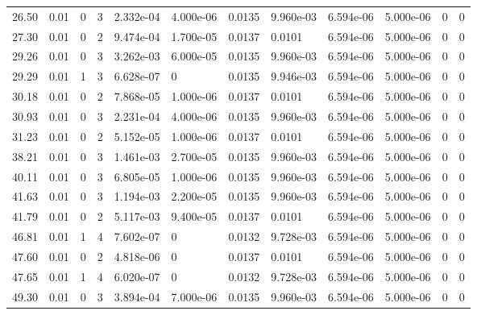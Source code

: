 \documentclass[preview]{standalone}
\begin{document}
{{\begin{tabular}{L{1.2cm}C{1.2cm} C{0.3cm}C{0.5cm} C{1.4cm}C{1.4cm} C{1.4cm}C{1.4cm} C{1.6cm}C{1.6cm} C{1.6cm}C{1.6cm}}
  26.50  &  0.01  & 0     &  3 &  2.332e-04  & 4.000e-06  &  0.0135&   9.960e-03& 6.594e-06 & 5.000e-06   &  0 & 0  \\ 
  27.30  &  0.01  & 0     &  2 &  9.474e-04  & 1.700e-05  &  0.0137&   0.0101& 6.594e-06 & 5.000e-06   &  0 & 0  \\ 
  29.26  &  0.01  & 0     &  3 &  3.262e-03  & 6.000e-05  &  0.0135&   9.960e-03& 6.594e-06 & 5.000e-06   &  0 & 0  \\ 
  29.29  &  0.01  & 1     &  3 &  6.628e-07  & 0  &  0.0135&   9.946e-03& 6.594e-06 & 5.000e-06   &  0 & 0  \\ 
  30.18  &  0.01  & 0     &  2 &  7.868e-05  & 1.000e-06  &  0.0137&   0.0101& 6.594e-06 & 5.000e-06   &  0 & 0  \\ 
  30.93  &  0.01  & 0     &  3 &  2.231e-04  & 4.000e-06  &  0.0135&   9.960e-03& 6.594e-06 & 5.000e-06   &  0 & 0  \\ 
  31.23  &  0.01  & 0     &  2 &  5.152e-05  & 1.000e-06  &  0.0137&   0.0101& 6.594e-06 & 5.000e-06   &  0 & 0  \\ 
  38.21  &  0.01  & 0     &  3 &  1.461e-03  & 2.700e-05  &  0.0135&   9.960e-03& 6.594e-06 & 5.000e-06   &  0 & 0  \\ 
  40.11  &  0.01  & 0     &  3 &  6.805e-05  & 1.000e-06  &  0.0135&   9.960e-03& 6.594e-06 & 5.000e-06   &  0 & 0  \\ 
  41.63  &  0.01  & 0     &  3 &  1.194e-03  & 2.200e-05  &  0.0135&   9.960e-03& 6.594e-06 & 5.000e-06   &  0 & 0  \\ 
  41.79  &  0.01  & 0     &  2 &  5.117e-03  & 9.400e-05  &  0.0137&   0.0101& 6.594e-06 & 5.000e-06   &  0 & 0  \\ 
  46.81  &  0.01  & 1     &  4 &  7.602e-07  & 0  &  0.0132&   9.728e-03& 6.594e-06 & 5.000e-06   &  0 & 0  \\ 
  47.60  &  0.01  & 0     &  2 &  4.818e-06  & 0  &  0.0137&   0.0101& 6.594e-06 & 5.000e-06   &  0 & 0  \\ 
  47.65  &  0.01  & 1     &  4 &  6.020e-07  & 0  &  0.0132&   9.728e-03& 6.594e-06 & 5.000e-06   &  0 & 0  \\ 
  49.30  &  0.01  & 0     &  3 &  3.894e-04  & 7.000e-06  &  0.0135&   9.960e-03& 6.594e-06 & 5.000e-06   &  0 & 0  \\ 
\hline 
\end{tabular} 

}}
\end{document}
